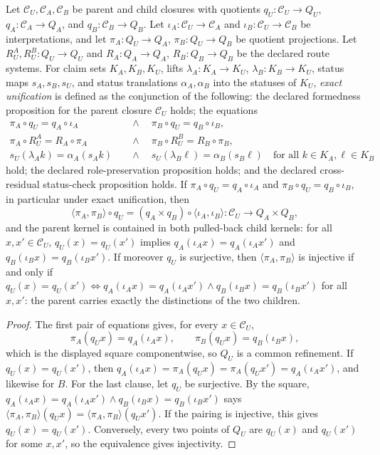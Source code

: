 \begin{theorem}\label{thm:F51}
Let \(\mathcal C_U,\mathcal C_A,\mathcal C_B\) be parent and child
closures with quotients \(q_U:\mathcal C_U\to Q_U\),
\(q_A:\mathcal C_A\to Q_A\), and \(q_B:\mathcal C_B\to Q_B\). Let
\(\iota_A:\mathcal C_U\to\mathcal C_A\) and
\(\iota_B:\mathcal C_U\to\mathcal C_B\) be interpretations, and let
\(\pi_A:Q_U\to Q_A\), \(\pi_B:Q_U\to Q_B\) be quotient projections.
Let \(R_U^A,R_U^B:Q_U\to Q_U\) and \(R_A:Q_A\to Q_A\),
\(R_B:Q_B\to Q_B\) be the declared route systems. For claim sets
\(K_A,K_B,K_U\), lifts \(\lambda_A:K_A\to K_U\),
\(\lambda_B:K_B\to K_U\), status maps \(s_A,s_B,s_U\), and status
translations \(\alpha_A,\alpha_B\) into the statuses of \(K_U\), \emph{exact
unification} is defined as the conjunction of the following: the
declared formedness proposition for the parent closure \(\mathcal C_U\) holds; the equations
\begin{align*}
  \pi_A\circ q_U=q_A\circ\iota_A
  &\quad\wedge\quad
  \pi_B\circ q_U=q_B\circ\iota_B,\\
  \pi_A\circ R_U^A=R_A\circ\pi_A
  &\quad\wedge\quad
  \pi_B\circ R_U^B=R_B\circ\pi_B,\\
  s_U(\lambda_A k)=\alpha_A(s_A k)
  &\quad\wedge\quad
  s_U(\lambda_B \ell)=\alpha_B(s_B \ell)
  \quad\text{for all }k\in K_A,\ell\in K_B
\end{align*}
hold; the declared role-preservation proposition holds; and the declared cross-residual status-check proposition holds. If
\(\pi_A\circ q_U=q_A\circ\iota_A\) and \(\pi_B\circ q_U=q_B\circ\iota_B\), in
particular under exact unification, then
\[
  \langle\pi_A,\pi_B\rangle\circ q_U
  =(q_A\times q_B)\circ\langle\iota_A,\iota_B\rangle
  :\mathcal C_U\to Q_A\times Q_B ,
\]
and the parent kernel is contained in both pulled-back child kernels: for all
\(x,x'\in\mathcal C_U\), \(q_U(x)=q_U(x')\) implies
\(q_A(\iota_A x)=q_A(\iota_A x')\) and \(q_B(\iota_B x)=q_B(\iota_B x')\).
If moreover \(q_U\) is surjective, then \(\langle\pi_A,\pi_B\rangle\) is injective
if and only if \(q_U(x)=q_U(x')\Leftrightarrow q_A(\iota_A x)=q_A(\iota_A x')
\wedge q_B(\iota_B x)=q_B(\iota_B x')\) for all \(x,x'\): the parent carries
exactly the distinctions of the two children.
\end{theorem}
\begin{proof}
The first pair of equations gives, for every
\(x\in\mathcal C_U\),
\[
  \pi_A(q_U x)=q_A(\iota_A x),
  \qquad
  \pi_B(q_U x)=q_B(\iota_B x),
\]
which is the displayed square componentwise, so \(Q_U\) is a common
refinement. If \(q_U(x)=q_U(x')\), then
\(q_A(\iota_A x)=\pi_A(q_U x)=\pi_A(q_U x')=q_A(\iota_A x')\), and likewise
for \(B\). For the last clause, let \(q_U\) be surjective. By the square,
\(q_A(\iota_A x)=q_A(\iota_A x')\wedge q_B(\iota_B x)=q_B(\iota_B x')\) says
\(\langle\pi_A,\pi_B\rangle(q_U x)=\langle\pi_A,\pi_B\rangle(q_U x')\). If the
pairing is injective, this gives \(q_U(x)=q_U(x')\). Conversely, every two
points of \(Q_U\) are \(q_U(x)\) and \(q_U(x')\) for some \(x,x'\), so the
equivalence gives injectivity.
\end{proof}

